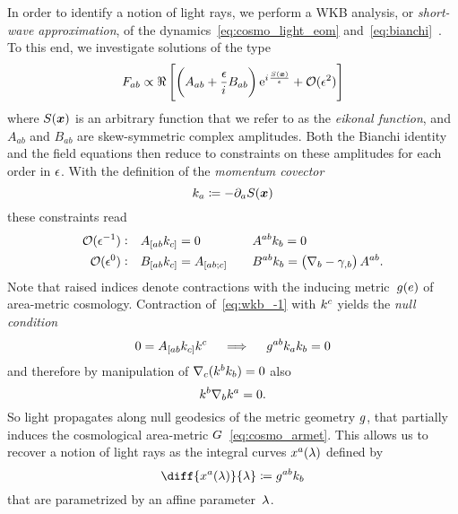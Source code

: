 In order to identify a notion of light rays, we perform a WKB analysis, or \emph{short-wave approximation}, of the dynamics~\eqref{eq:cosmo_light_eom} and~\eqref{eq:bianchi}~\autocite{SchneiderGravlens,EtheringtonNBiref,EtheringtonBiref}. To this end, we investigate solutions of the type
\begin{equation}\label{eq:fstr_gen}
	F_{ab}\propto\Re\left[\left(A_{ab}+\frac{\epsilon}{{i\mkern1mu}}B_{ab}\right)\mathrm{e}^{{i\mkern1mu}\frac{S(\boldsymbol{x})}{\epsilon}}+\mathcal{O}(\epsilon^2)\right]
\end{equation}
where $S(\boldsymbol{x})$ is an arbitrary function that we refer to as the \emph{eikonal function}, and $A_{ab}$ and $B_{ab}$ are skew-symmetric complex amplitudes. Both the Bianchi identity and the field equations then reduce to constraints on these amplitudes for each order in $\epsilon$. With the definition of the \emph{momentum covector}
\begin{equation}
	k_a\coloneqq-\partial_aS(\boldsymbol{x})
\end{equation}
these constraints read
\begin{alignat}{2}
	\mathcal{O}(\epsilon^{-1}): \quad &A_{[ ab}k_{c ]}=0 \quad &&A^{ab}k_b=0 \label{eq:wkb_-1}\\
	\mathcal{O}(\epsilon^{0}): \quad &B_{[ ab}k_{c]}=A_{[ ab;c]} \quad &&B^{ab}k_b=\left(\nabla_b-\gamma_{,b}\right)A^{ab} \label{eq:wkb_0}
	\mathpunct{.}
\end{alignat}
Note that raised indices denote contractions with the inducing metric~$g(e)$ of area-metric cosmology. Contraction of~\eqref{eq:wkb_-1} with $k^c$ yields the \emph{null condition}
\begin{equation}
	0=A_{[ ab}k_{c]}k^c \quad \implies \quad g^{ab}k_a k_b=0 \label{eq:null_cond}
\end{equation}
and therefore by manipulation of $\nabla_c(k^b k_b)=0$ also
\begin{equation}
	k^b\nabla_bk^a=0
	\mathpunct{.}
\end{equation}
So light propagates along null geodesics of the metric geometry $g$, that partially induces the cosmological area-metric $G$~\eqref{eq:cosmo_armet}. This allows us to recover a notion of light rays as the integral curves $x^a(\lambda)$ defined by
\begin{equation}
	\diff{\coordx^a(\affpar)}{\affpar}\defeq \met^{ab}\momcov_b
\end{equation}
that are parametrized by an affine parameter~$\lambda$.

